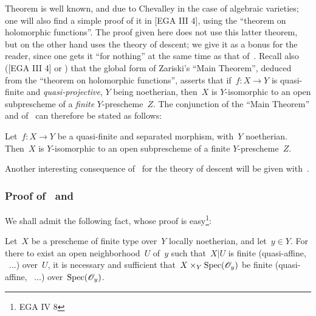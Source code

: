 \begin{remarks}
\label{VIII.6.3}
Theorem
 is well known, and due to
Chevalley in the case of algebraic varieties; one will
also find a simple proof of it in [EGA III 4],
using the ``theorem on holomorphic functions''. The
proof given here does not use this latter
theorem, but on the other hand uses the theory of descent; we
give it as a bonus for the reader, since one gets it ``for nothing'' at
the same time as that of~. Recall also ([EGA III
4] or \cite{VIII.1}) that the global form of Zariski's ``Main Theorem'',
deduced from the ``theorem on holomorphic functions'', asserts
that if~$f\colon X\to Y$ is quasi-finite and \emph{quasi-projective}, $Y$
being noetherian, then~$X$ is $Y$-isomorphic to an
open subprescheme of a
\emph{finite} $Y$-prescheme~$Z$. The conjunction of the ``Main Theorem'' and
of~ can therefore be stated as follows:
\end{remarks}

\begin{corollary}
\label{VIII.6.4}
Let~$f\colon X\to Y$ be a quasi-finite and separated morphism,
with~$Y$ noetherian. Then~$X$ is $Y$-isomorphic to an
open subprescheme of a finite $Y$-prescheme~$Z$.
\end{corollary}

Another interesting consequence of~ for the
theory of descent will be given with~.

\subsubsection*{Proof of~ and~}
We shall admit the following fact, whose proof is
easy\footnote{\Cf EGA IV 8}:

\begin{lemma}
\label{VIII.6.5}
Let~$X$ be a prescheme of finite type over~$Y$ locally
noetherian, and let~$y\in Y$. For there to exist an open
neighborhood~$U$ of~$y$ such that~$X|U$ is finite (\resp quasi-affine,
\resp\ ...) over~$U$, it is necessary and sufficient
that~$X\times_{Y}\operatorname{Spec}(\mathscr{O}_{y})$ be finite (\resp quasi-affine,
\resp\ ...) over~$\operatorname{Spec}(\mathscr{O}_{y})$.
\end{lemma}

